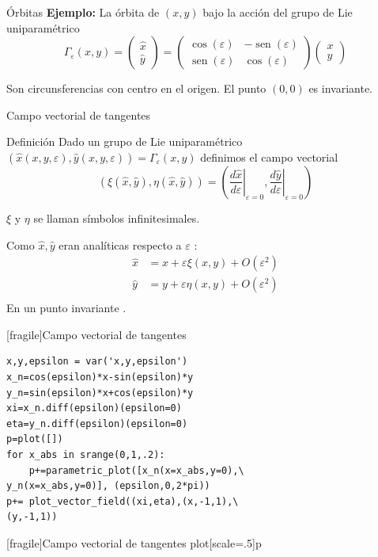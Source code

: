 \documentclass{article}
\renewcommand{\emph}[1]{\textcolor[rgb]{1,0,0}{#1}}
\renewcommand{\epsilon}{\varepsilon}
\DeclareMathOperator{\sen}{sen}
\begin{document}
 {Órbitas}
 \textbf{Ejemplo:} La órbita de $(x,y)$ bajo la acción del grupo  de Lie uniparamétrico 
\[
\Gamma_{\epsilon}(x,y)= \begin{pmatrix} \hat{x}\\ \hat{y}
\end{pmatrix}=\begin{pmatrix} \cos(\epsilon) & -\sen(\epsilon)
\\ \sen(\epsilon) & \cos(\epsilon)
\end{pmatrix} \begin{pmatrix} x\\ y
\end{pmatrix}
\]

Son circunsferencias con centro en el origen. El punto $(0,0)$ es invariante.




 {Campo vectorial de tangentes}

{Definición}
 Dado un grupo de Lie uniparamétrico $(\hat{x}(x,y,\epsilon),\hat{y}(x,y,\epsilon))=\Gamma_{\epsilon}(x,y)$  definimos el campo vectorial
\[(\xi(\hat{x},\hat{y}),\eta(\hat{x}, \hat{y}))=\left(\left.\frac{d\hat{x}}{d\epsilon}\right|_{\epsilon=0}, \left.\frac{d\hat{y}}{d\epsilon}\right|_{\epsilon=0}   \right)\]

 $\xi$ y $\eta$ se llaman \emph{símbolos infinitesimales}.


 Como $\hat{x},\hat{y}$ eran analíticas respecto a $\epsilon$ :
\[
\begin{array}{cc}
\hat{x}&=x+\epsilon\xi(x,y)+O(\epsilon^2)\\
\hat{y}&=y+\epsilon\eta(x,y)+O(\epsilon^2)\\
\end{array}
\]
 En un punto invariante .



[fragile]{Campo vectorial de tangentes}
\begin{lstlisting}
x,y,epsilon = var('x,y,epsilon')
x_n=cos(epsilon)*x-sin(epsilon)*y
y_n=sin(epsilon)*x+cos(epsilon)*y
xi=x_n.diff(epsilon)(epsilon=0)
eta=y_n.diff(epsilon)(epsilon=0)
p=plot([])
for x_abs in srange(0,1,.2):
    p+=parametric_plot([x_n(x=x_abs,y=0),\
y_n(x=x_abs,y=0)], (epsilon,0,2*pi))
p+= plot_vector_field((xi,eta),(x,-1,1),\
(y,-1,1))
\end{lstlisting}




[fragile]{Campo vectorial de tangentes}
plot[scale=.5]{p}
\end{document}
